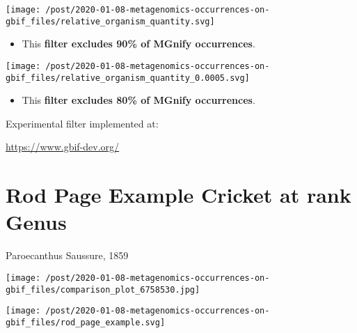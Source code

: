 \documentclass[]{article}
\providecommand{\tightlist}{%
  \setlength{\itemsep}{0pt}\setlength{\parskip}{0pt}}
\begin{document}
\texttt{[image: /post/2020-01-08-metagenomics-occurrences-on-gbif\_files/relative\_organism\_quantity.svg]}

\begin{itemize}
\tightlist
\item
  This \textbf{filter excludes 90\% of MGnify occurrences}.
\end{itemize}

\texttt{[image: /post/2020-01-08-metagenomics-occurrences-on-gbif\_files/relative\_organism\_quantity\_0.0005.svg]}

\begin{itemize}
\tightlist
\item
  This \textbf{filter excludes 80\% of MGnify occurrences}.
\end{itemize}

Experimental filter implemented at:

\url{https://www.gbif-dev.org/}

\hypertarget{rod-page-example-cricket-at-rank-genus}{%
\section{Rod Page Example Cricket at rank
Genus}\label{rod-page-example-cricket-at-rank-genus}}

Paroecanthus Saussure, 1859

\texttt{[image: /post/2020-01-08-metagenomics-occurrences-on-gbif\_files/comparison\_plot\_6758530.jpg]}

\texttt{[image: /post/2020-01-08-metagenomics-occurrences-on-gbif\_files/rod\_page\_example.svg]}
\end{document}
